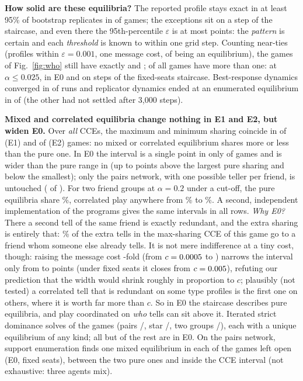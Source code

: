 \documentclass[conference]{IEEEtran}
\theoremstyle{plain}
\theoremstyle{definition}\newtheorem{definition}{Definition}
\newcommand{\finding}[1]{\textbf{#1}}
\begin{document}
\finding{How solid are these equilibria?} The reported profile stays exact in at least 95\% of bootstrap replicates in \XoneBootOk{} of \XoneBootTot{} games; the exceptions sit on a step of the staircase,
and even there the 95th-percentile $\varepsilon$ is at most \XoneWorstEpsPP{} points: the \emph{pattern} is certain and each \emph{threshold} is known to within one grid step.
Counting near-ties (profiles within $\varepsilon=0.001$, one message cost, of being an equilibrium), the games of Fig.~\ref{fig:who} still have exactly \EpsBneHeadSeats{} and \EpsBneHeadBar;
of all \EpsBneGames{} games \EpsBneMulti{} have more than one: \EpsBneLowAlpha{} at $\alpha\le0.025$, \EpsBneEzero{} in E0 and \EpsBneStep{} on steps of the fixed-seats staircase.
Best-response dynamics converged in \XoneBrdOk{} of \XoneBrdTot{} runs and replicator dynamics ended at an enumerated equilibrium in \XoneRepMatch{} of \XoneRepTot{} (the other \XoneRepRest{} had not settled after 3{,}000 steps).


\finding{Mixed and correlated equilibria change nothing in E1 and E2, but widen E0.} Over \emph{all} CCEs, the maximum and minimum sharing coincide in \CceSingleEone{} of \CceTotEone{} (E1) and \CceSingleEtwo{} of \CceTotEtwo{} (E2) games:
no mixed or correlated equilibrium shares more or less than the pure one. In E0 the interval is a single point in only \CceSingleEzero{} of \CceTotEzero{} games and is wider than the pure range in \CceWiderEzero{}
(up to \CceEzeroAboveMax{} points above the largest pure sharing and \CceEzeroBelowMax{} below the smallest); only the pairs network, with one possible teller per friend, is untouched (\CceEzeroPairsEqual{} of \CceEzeroPairsTot).
For two friend groups at $\alpha=0.2$ under a cut-off, the \CceExN{} pure equilibria share \CceExPure\%, correlated play anywhere from \CceExLo\% to \CceExHi\%.
A second, independent implementation of the programs gives the same intervals in all \CceCrossRows{} rows.
\emph{Why E0?} There a second tell of the same friend is exactly redundant, and the extra sharing is entirely that: \EzmRedundantBar\% of the extra tells in the max-sharing CCE of this game go to a friend whom someone else already tells.
It is not mere indifference at a tiny cost, though: raising the message cost \EzmCRatio-fold (from $c=0.0005$ to \EzmCHi) narrows the interval only from \EzmWidthBarLo{} to \EzmWidthBarHi{} points (under fixed seats it closes from $c=0.005$),
refuting our prediction that the width would shrink roughly in proportion to $c$; plausibly (not tested) a correlated tell that is redundant on some type profiles is the first one on others, where it is worth far more than $c$.
So in E0 the staircase describes pure equilibria, and play coordinated on \emph{who} tells can sit above it.
Iterated strict dominance solves \DomSolved{} of the \DomTot{} games (pairs \DomPairsSolved/\DomPairsTot, star \DomStarSolved/\DomStarTot, two groups \DomTwoGroupsSolved/\DomTwoGroupsTot), each with a unique equilibrium of any kind; all but \DomOpenOutsideEzero{} of the rest are in E0.
On the pairs network, support enumeration finds one mixed equilibrium in each of the \SuppPairsMixedGames{} games left open (E0, fixed seats), between the two pure ones and inside the CCE interval (not exhaustive: three agents mix).
\end{document}
